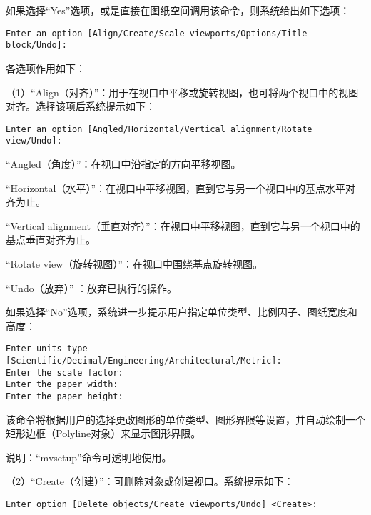 \begin{compactenum}
\item 如果选择“Yes”选项，或是直接在图纸空间调用该命令，则系统给出如下选项：

\begin{verbatim}
Enter an option [Align/Create/Scale viewports/Options/Title block/Undo]:
\end{verbatim}

各选项作用如下：


（1）“Align（对齐）”：用于在视口中平移或旋转视图，也可将两个视口中的视图对齐。选择该项后系统提示如下：

\begin{verbatim}
Enter an option [Angled/Horizontal/Vertical alignment/Rotate view/Undo]:
\end{verbatim}

\begin{compactitem}
\item “Angled（角度）”：在视口中沿指定的方向平移视图。
\item “Horizontal（水平）”：在视口中平移视图，直到它与另一个视口中的基点水平对齐为止。
\item “Vertical alignment（垂直对齐）”：在视口中平移视图，直到它与另一个视口中的基点垂直对齐为止。
\item “Rotate view（旋转视图）”：在视口中围绕基点旋转视图。
\item “Undo（放弃）”	：放弃已执行的操作。
\end{compactitem}

\item 如果选择“No”选项，系统进一步提示用户指定单位类型、比例因子、图纸宽度和高度：

\begin{verbatim}
Enter units type [Scientific/Decimal/Engineering/Architectural/Metric]: 
Enter the scale factor: 
Enter the paper width: 
Enter the paper height: 
\end{verbatim}

该命令将根据用户的选择更改图形的单位类型、图形界限等设置，并自动绘制一个矩形边框（Polyline对象）来显示图形界限。

说明：“mvsetup”命令可透明地使用。
\end{compactenum}



（2）“Create（创建）”：可删除对象或创建视口。系统提示如下：

\begin{verbatim}
Enter option [Delete objects/Create viewports/Undo] <Create>:
\end{verbatim}

